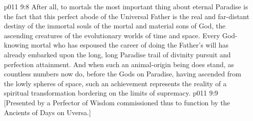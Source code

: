 \vs p011 9:8 \pc After all, to mortals the most important thing about eternal Paradise is the fact that this perfect abode of the Universal Father is the real and far\hyp{}distant destiny of the immortal souls of the mortal and material sons of God, the ascending creatures of the evolutionary worlds of time and space. Every God\hyp{}knowing mortal who has espoused the career of doing the Father’s will has already embarked upon the long, long Paradise trail of divinity pursuit and perfection attainment. And when such an animal\hyp{}origin being does stand, as countless numbers now do, before the Gods on Paradise, having ascended from the lowly spheres of space, such an achievement represents the reality of a spiritual transformation bordering on the limits of supremacy.
\vsetoff
\vs p011 9:9 [Presented by a Perfector of Wisdom commissioned thus to function by the Ancients of Days on Uversa.]
